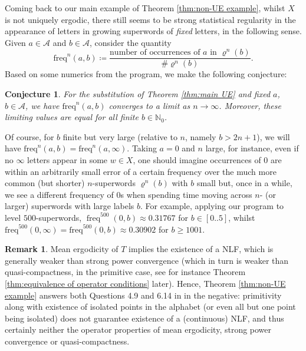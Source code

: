 \documentclass[11pt]{amsart}
\numberwithin{equation}{section}
\theoremstyle{plain}
\newtheorem{conjecture}[theorem]{Conjecture}
\theoremstyle{definition}
\newtheorem{remark}[theorem]{Remark}
\newcommand{\N}{{\mathbb N}}
\newcommand{\mc}{\mathcal}
\newcommand{\A}{\mc A}
\newcommand{\freq}{\operatorname{freq}}
\newcommand{\sub}{\varrho}
\begin{document}
Coming back to our main example of Theorem \ref{thm:non-UE example}, whilst \(X\) is not uniquely ergodic, there still seems to be strong statistical regularity in the appearance of letters in growing superwords of \emph{fixed} letters, in the following sense. Given \(a \in \A\) and \(b \in \A\), consider the quantity
\[
\mathrm{freq}^n(a,b) \coloneqq \frac{\text{number of occurrences of } a \text{ in } \sub^n(b)}{\# \sub^n(b)} .
\]
Based on some numerics from the program, we make the following conjecture: 

\begin{conjecture}
For the substitution of Theorem \ref{thm:main UE} and fixed \(a\), \(b \in \A\), we have \(\mathrm{freq}^n(a,b)\) converges to a limit as \(n \to \infty\). Moreover, these limiting values are equal for all finite \(b \in \N_0\).
\end{conjecture}

Of course, for \(b\) finite but very large (relative to \(n\), namely \(b > 2n+1\)), we will have \(\mathrm{freq}^n(a,b) = \mathrm{freq}^n(a,\infty)\). Taking \(a = 0\) and \(n\) large, for instance, even if no \(\infty\) letters appear in some \(w \in X\), one should imagine occurrences of \(0\) are within an arbitrarily small error of a certain frequency over the much more common (but shorter) \(n\)-superwords \(\sub^n(b)\) with \(b\) small but, once in a while, we see a different frequency of \(0\)s when spending time moving across \(n\)- (or larger) superwords with large labels \(b\). For example, applying our program to level \(500\)-superwords, \(\freq^{500}(0,b) \approx 0.31767\) for \(b \in [0..5]\), whilst \(\mathrm{freq}^{500}(0,\infty) = \mathrm{freq}^{500}(0,b) \approx 0.30902\) for \(b \geq 1001\).

\begin{remark}
Mean ergodicity of \(T\) implies the existence of a NLF, which is generally weaker than strong power convergence (which in turn is weaker than quasi-compactness, in the primitive case, see for instance Theorem \ref{thm:equivalence of operator conditions} later). Hence, Theorem \ref{thm:non-UE example} answers both Questions 4.9 and 6.14 in \cite{MRW25} in the negative: primitivity along with existence of isolated points in the alphabet (or even all but one point being isolated) does not guarantee existence of a (continuous) NLF, and thus certainly neither the operator properties of mean ergodicity, strong power convergence or quasi-compactness.
\end{remark}
\end{document}
